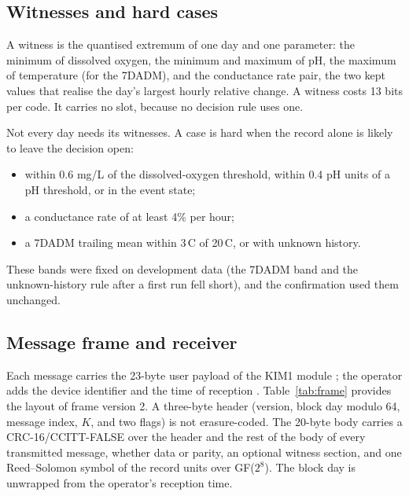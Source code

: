\subsection{Witnesses and hard cases}
\label{sec:witness}
A witness is the quantised extremum of one day and one parameter: the minimum of dissolved oxygen, the minimum and maximum of pH, the maximum of temperature (for the 7DADM), and the conductance rate pair, the two kept values that realise the day's largest hourly relative change. A witness costs 13 bits per code. It carries no slot, because no decision rule uses one.

Not every day needs its witnesses. A case is hard when the record alone is likely to leave the decision open:
\begin{itemize}
  \item within 0.6 mg/L of the dissolved-oxygen threshold, within 0.4 pH units of a pH threshold, or in the event state;
  \item a conductance rate of at least 4\% per hour;
  \item a 7DADM trailing mean within 3\,\textdegree C of 20\,\textdegree C, or with unknown history.
\end{itemize}
These bands were fixed on development data (the 7DADM band and the unknown-history rule after a first run fell short), and the confirmation used them unchanged.

\subsection{Message frame and receiver}
\label{sec:frame}
Each message carries the 23-byte user payload of the KIM1 module \citep{kineis2023kim1}; the operator adds the device identifier and the time of reception \citep{kineis2024formats}. Table~\ref{tab:frame} provides the layout of frame version 2. A three-byte header (version, block day modulo 64, message index, $K$, and two flags) is not erasure-coded. The 20-byte body carries a CRC-16/CCITT-FALSE over the header and the rest of the body of every transmitted message, whether data or parity, an optional witness section, and one Reed--Solomon symbol of the record units over GF($2^8$). The block day is unwrapped from the operator's reception time.

